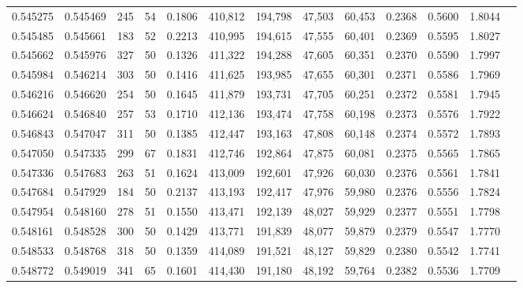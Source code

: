 \begin{tabular}{rrrrrrrrrrrrr}
0.545275 & 0.545469 &   245 &  54 &                                     0.1806 & 410,812 & 194,798 &  47,503 &  60,453 & 0.2368 & 0.5600 & 1.8044 \\
0.545485 & 0.545661 &   183 &  52 &                                     0.2213 & 410,995 & 194,615 &  47,555 &  60,401 & 0.2369 & 0.5595 & 1.8027 \\
0.545662 & 0.545976 &   327 &  50 &                                     0.1326 & 411,322 & 194,288 &  47,605 &  60,351 & 0.2370 & 0.5590 & 1.7997 \\
0.545984 & 0.546214 &   303 &  50 &                                     0.1416 & 411,625 & 193,985 &  47,655 &  60,301 & 0.2371 & 0.5586 & 1.7969 \\
0.546216 & 0.546620 &   254 &  50 &                                     0.1645 & 411,879 & 193,731 &  47,705 &  60,251 & 0.2372 & 0.5581 & 1.7945 \\
0.546624 & 0.546840 &   257 &  53 &                                     0.1710 & 412,136 & 193,474 &  47,758 &  60,198 & 0.2373 & 0.5576 & 1.7922 \\
0.546843 & 0.547047 &   311 &  50 &                                     0.1385 & 412,447 & 193,163 &  47,808 &  60,148 & 0.2374 & 0.5572 & 1.7893 \\
0.547050 & 0.547335 &   299 &  67 &                                     0.1831 & 412,746 & 192,864 &  47,875 &  60,081 & 0.2375 & 0.5565 & 1.7865 \\
0.547336 & 0.547683 &   263 &  51 &                                     0.1624 & 413,009 & 192,601 &  47,926 &  60,030 & 0.2376 & 0.5561 & 1.7841 \\
0.547684 & 0.547929 &   184 &  50 &                                     0.2137 & 413,193 & 192,417 &  47,976 &  59,980 & 0.2376 & 0.5556 & 1.7824 \\
0.547954 & 0.548160 &   278 &  51 &                                     0.1550 & 413,471 & 192,139 &  48,027 &  59,929 & 0.2377 & 0.5551 & 1.7798 \\
0.548161 & 0.548528 &   300 &  50 &                                     0.1429 & 413,771 & 191,839 &  48,077 &  59,879 & 0.2379 & 0.5547 & 1.7770 \\
0.548533 & 0.548768 &   318 &  50 &                                     0.1359 & 414,089 & 191,521 &  48,127 &  59,829 & 0.2380 & 0.5542 & 1.7741 \\
0.548772 & 0.549019 &   341 &  65 &                                     0.1601 & 414,430 & 191,180 &  48,192 &  59,764 & 0.2382 & 0.5536 & 1.7709 \\

\end{tabular}
